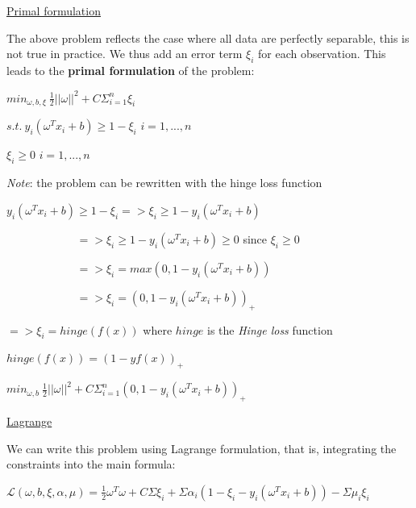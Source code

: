 \vspace{5mm}

\underline{Primal formulation}

\vspace{5mm}

The above problem reflects the case where all data are perfectly separable, this is not true in practice. We thus add an error term $\xi_i$ for each observation. This leads to the \textbf{primal formulation} of the problem:

\begin{center}
$min_{\omega,b, \xi}~\frac{1}{2}||\omega||^2+C\Sigma_{i=1}^{n}\xi_i$

$s.t.~y_i(\omega^Tx_i+b) \geq 1 - \xi_i$ $i=1,...,n$

$\xi_i \geq 0$ $i=1,...,n$
\end{center}

\vspace{5mm}

\textit{Note}: the problem can be rewritten with the hinge loss function

$y_i(\omega^Tx_i+b) \geq 1 - \xi_i => \xi_i \geq 1 - y_i(\omega^Tx_i+b)$

$~~~~~~~~~~~~~~~~~~~~~~~~~~~~ => \xi_i \geq 1 - y_i(\omega^Tx_i+b) \geq 0$ since $\xi_i \geq 0$

$~~~~~~~~~~~~~~~~~~~~~~~~~~~~ => \xi_i = max(0, 1 - y_i(\omega^Tx_i+b))$

$~~~~~~~~~~~~~~~~~~~~~~~~~~~~ => \xi_i = (0, 1 - y_i(\omega^Tx_i+b))_+$

$=> \xi_i = hinge(f(x))$ where $hinge$ is the \textit{Hinge loss} function 

$hinge(f(x)) = (1 - yf(x))_+$

\begin{center}
$min_{\omega,b}~\frac{1}{2}||\omega||^2+C\Sigma_{i=1}^{n} (0, 1 - y_i(\omega^Tx_i+b))_+$
\end{center}

\vspace{5mm}

\underline{Lagrange}

\vspace{5mm}

We can write this problem using Lagrange formulation, that is, integrating the constraints into the main formula:

$\mathcal{L}(\omega,b,\xi, \alpha, \mu) = \frac{1}{2}\omega^T\omega+C\Sigma \xi_i + \Sigma \alpha_i (1-\xi_i - y_i(\omega^Tx_i+b)) - \Sigma \mu_i \xi_i$


